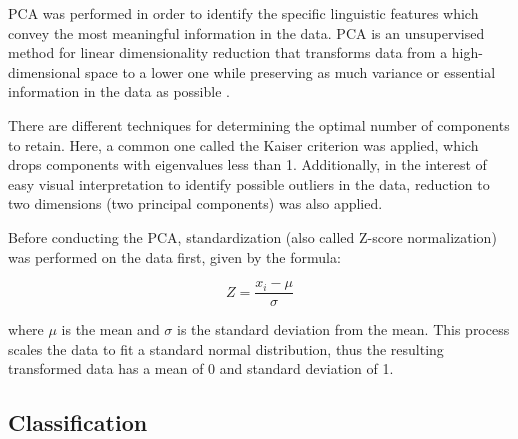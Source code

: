 \documentclass[12pt,a4paper]{article}
\numberwithin{figure}{section}
\numberwithin{table}{section}
\numberwithin{definition}{section}
\begin{document}

PCA was performed in order to identify the specific linguistic features which convey the most meaningful information in the data. PCA is an unsupervised method for linear dimensionality reduction that transforms data from a high-dimensional space to a lower one while preserving as much variance or essential information in the data as possible \parencite{Deng2024article}. 


There are different techniques for determining the optimal number of components to retain. Here, a common one called the Kaiser criterion was applied, which drops components with eigenvalues less than 1. Additionally, in the interest of easy visual interpretation to identify possible outliers in the data, reduction to two dimensions (two principal components) was also applied. 

Before conducting the PCA, standardization (also called Z-score normalization) was performed on the data first, given by the formula:

\begin{equation}\label{eq:standardize}
  Z = \frac{x_i - \mu}{\sigma}
\end{equation}

where $\mu$ is the mean and $\sigma$ is the standard deviation from the mean. This process scales the data to fit a standard normal distribution, thus the resulting transformed data has a mean of 0 and standard deviation of 1. 


\subsection{Classification}
\label{ssec:classification}

\end{document}
